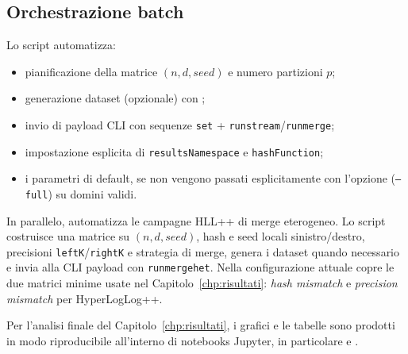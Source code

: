 \subsection{Orchestrazione batch}

	Lo script  automatizza:
	\begin{itemize}
	    \item pianificazione della matrice \((n,d,seed)\) e numero partizioni \(p\);
	    \item generazione dataset (opzionale) con ;
	    \item invio di payload CLI con sequenze \texttt{set} + \texttt{runstream}/\texttt{runmerge};
	    \item impostazione esplicita di \texttt{resultsNamespace} e \texttt{hashFunction};
	    \item i parametri di default, se non vengono passati esplicitamente con l'opzione (\texttt{--full}) su domini validi.
	\end{itemize}

	In parallelo,  automatizza le
	campagne HLL++ di merge eterogeneo. Lo script costruisce una matrice su
	\((n,d,seed)\), hash e seed locali sinistro/destro, precisioni
	\texttt{leftK}/\texttt{rightK} e strategia di merge, genera i dataset quando
	necessario e invia alla CLI payload con \texttt{runmergehet}. Nella
	configurazione attuale copre le due matrici minime usate nel Capitolo~\ref{chp:risultati}:
	\emph{hash mismatch} e \emph{precision mismatch} per HyperLogLog++.

	Per l'analisi finale del Capitolo~\ref{chp:risultati}, i grafici e le tabelle
	sono prodotti in modo riproducibile all'interno di notebooks Jupyter, in
	particolare  e
	.

